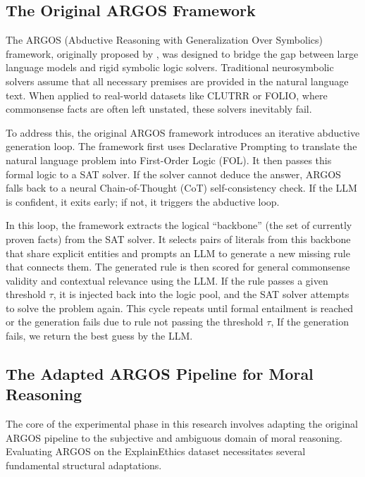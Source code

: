 \subsection{The Original ARGOS Framework}
\label{subsec:originalArgos}
The ARGOS (Abductive Reasoning with Generalization Over Symbolics) framework, originally proposed by \citet{cotnareanu2026balanced}, was designed to bridge the gap between large language models and rigid symbolic logic solvers. Traditional neurosymbolic solvers assume that all necessary premises are provided in the natural language text. When applied to real-world datasets like CLUTRR or FOLIO, where commonsense facts are often left unstated, these solvers inevitably fail. 

To address this, the original ARGOS framework introduces an iterative abductive generation loop. The framework first uses Declarative Prompting to translate the natural language problem into First-Order Logic (FOL). It then passes this formal logic to a SAT solver. If the solver cannot deduce the answer, ARGOS falls back to a neural Chain-of-Thought (CoT) self-consistency check. If the LLM is confident, it exits early; if not, it triggers the abductive loop. 

In this loop, the framework extracts the logical ``backbone'' (the set of currently proven facts) from the SAT solver. It selects pairs of literals from this backbone that share explicit entities and prompts an LLM to generate a new missing rule that connects them. The generated rule is then scored for general commonsense validity and contextual relevance using the LLM. If the rule passes a given threshold $\tau$, it is injected back into the logic pool, and the SAT solver attempts to solve the problem again. This cycle repeats until formal entailment is reached or the generation fails due to rule not passing the threshold $\tau$, If the generation fails, we return the best guess by the LLM.

\subsection{The Adapted ARGOS Pipeline for Moral Reasoning}
\label{subsec:adaptedArgos}
The core of the experimental phase in this research involves adapting the original ARGOS pipeline to the subjective and ambiguous domain of moral reasoning. Evaluating ARGOS on the ExplainEthics dataset \citep{quan2024enhancing} necessitates several fundamental structural adaptations. 

